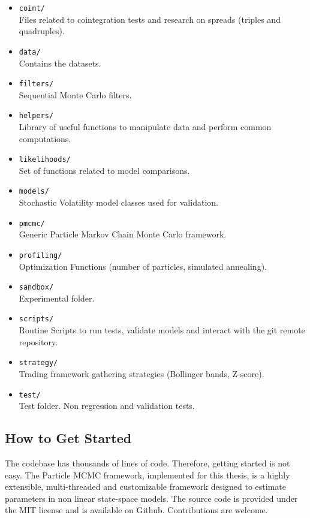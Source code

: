 \documentclass[11pt,a4,twosided,singlespacing,titlepagenumber=on]{scrreprt}
\numberwithin{equation}{chapter} %
\theoremstyle{remark}
\begin{document}
\begin{itemize}
\item \texttt{coint/} \\
Files related to cointegration tests and research on spreads (triples and quadruples).
\item \texttt{data/} \\
Contains the datasets.
\item \texttt{filters/} \\
Sequential Monte Carlo filters.
\item \texttt{helpers/} \\
Library of useful functions to manipulate data and perform common computations.
\item \texttt{likelihoods/} \\
Set of functions related to model comparisons.
\item \texttt{models/} \\
Stochastic Volatility model classes used for validation.
\item \texttt{pmcmc/} \\
Generic Particle Markov Chain Monte Carlo framework.
\item \texttt{profiling/} \\
Optimization Functions (number of particles, simulated annealing).
\item \texttt{sandbox/} \\
Experimental folder.
\item \texttt{scripts/} \\
Routine Scripts to run tests, validate models and interact with the git remote repository.
\item \texttt{strategy/} \\
Trading framework gathering strategies (Bollinger bands, Z-score).
\item \texttt{test/} \\
Test folder. Non regression and validation tests.
\end{itemize}

\subsection{How to Get Started} 
The codebase has thousands of lines of code. Therefore, getting started is not easy.
The Particle MCMC framework, implemented for this thesis, is a highly extensible, multi-threaded and customizable framework designed to estimate parameters in non linear state-space models. The source code is provided under the MIT license and is available on Github. Contributions are welcome. \\
\end{document}
